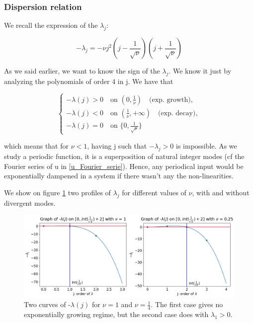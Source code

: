 \documentclass[12pt]{article}
\begin{document}
\subsubsection{Dispersion relation}
We recall the expression of the $\lambda_j:$

\begin{equation}
    -\lambda_j = -\nu j^2(j-\frac{1}{\sqrt{\nu}})(j+\frac{1}{\sqrt{\nu}})
\end{equation}

As we said earlier, we want to know the sign of the $\lambda_j$. We know it just by analyzing the polynomials of order 4 in j. We have that

\begin{equation}
\left\{
\begin{aligned}
    -\lambda(j) > 0 \quad  \text{on } (0, \frac{1}{\nu}) \quad \text{(exp. growth)},\\
    -\lambda(j) < 0 \quad  \text{on } (\frac{1}{\nu}, +\infty)  \quad \text{(exp. decay)},\\
    -\lambda(j) = 0 \quad \text{on } \{0, \frac{1}{\sqrt{\nu}}\}
\end{aligned}
\right.
\end{equation}

which means that for $\nu < 1$, having j such that $-\lambda_j > 0$ is impossible. As we study a periodic function, it is a superposition of natural integer modes (cf the Fourier series of u in \ref{u_Fourier_serie}). Hence, any periodical input would be exponentially dampened in a system if there wasn't any the non-linearities. 

We show on figure \ref{fig:KS_eq_lambda_growing_and_dampening} two profiles of $\lambda_j$ for different values of $\nu$, with and without divergent modes.
\\

\begin{figure}[h]
\includegraphics[width=1\textwidth]{KS_eq/plot_dispersion_nu_1_1-4.png}
\caption{Two curves of -$\lambda(j)$ for $\nu=1$ and $\nu=\frac{1}{4}$. The first case gives no exponentially growing regime, but the second case does with $\lambda_1 >0$. } 
\label{fig:KS_eq_lambda_growing_and_dampening}
\end{figure}
\end{document}
